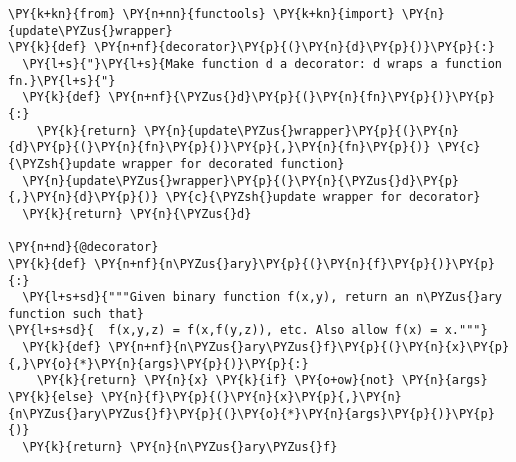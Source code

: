 \begin{Verbatim}[commandchars=\\\{\}]
\PY{k+kn}{from} \PY{n+nn}{functools} \PY{k+kn}{import} \PY{n}{update\PYZus{}wrapper}
\PY{k}{def} \PY{n+nf}{decorator}\PY{p}{(}\PY{n}{d}\PY{p}{)}\PY{p}{:}
  \PY{l+s}{"}\PY{l+s}{Make function d a decorator: d wraps a function fn.}\PY{l+s}{"}
  \PY{k}{def} \PY{n+nf}{\PYZus{}d}\PY{p}{(}\PY{n}{fn}\PY{p}{)}\PY{p}{:}
    \PY{k}{return} \PY{n}{update\PYZus{}wrapper}\PY{p}{(}\PY{n}{d}\PY{p}{(}\PY{n}{fn}\PY{p}{)}\PY{p}{,}\PY{n}{fn}\PY{p}{)} \PY{c}{\PYZsh{}update wrapper for decorated function}
  \PY{n}{update\PYZus{}wrapper}\PY{p}{(}\PY{n}{\PYZus{}d}\PY{p}{,}\PY{n}{d}\PY{p}{)} \PY{c}{\PYZsh{}update wrapper for decorator}
  \PY{k}{return} \PY{n}{\PYZus{}d}

\PY{n+nd}{@decorator}
\PY{k}{def} \PY{n+nf}{n\PYZus{}ary}\PY{p}{(}\PY{n}{f}\PY{p}{)}\PY{p}{:}
  \PY{l+s+sd}{"""Given binary function f(x,y), return an n\PYZus{}ary function such that}
\PY{l+s+sd}{  f(x,y,z) = f(x,f(y,z)), etc. Also allow f(x) = x."""}
  \PY{k}{def} \PY{n+nf}{n\PYZus{}ary\PYZus{}f}\PY{p}{(}\PY{n}{x}\PY{p}{,}\PY{o}{*}\PY{n}{args}\PY{p}{)}\PY{p}{:}
    \PY{k}{return} \PY{n}{x} \PY{k}{if} \PY{o+ow}{not} \PY{n}{args} \PY{k}{else} \PY{n}{f}\PY{p}{(}\PY{n}{x}\PY{p}{,}\PY{n}{n\PYZus{}ary\PYZus{}f}\PY{p}{(}\PY{o}{*}\PY{n}{args}\PY{p}{)}\PY{p}{)}
  \PY{k}{return} \PY{n}{n\PYZus{}ary\PYZus{}f}
\end{Verbatim}
